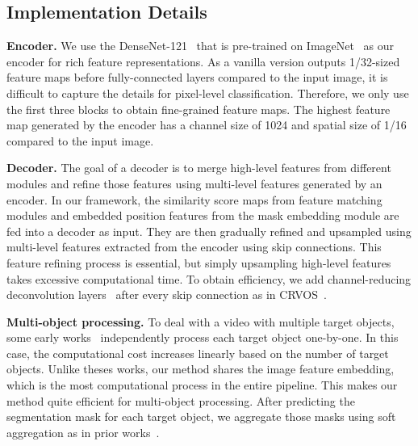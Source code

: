 \documentclass[10pt,twocolumn,letterpaper]{article}
\begin{document}
	
	
	\subsection{Implementation Details}
	\noindent\textbf{Encoder.} We use the DenseNet-121~\cite{densenet} that is pre-trained on ImageNet~\cite{imagenet} as our encoder for rich feature representations. As a vanilla version outputs 1/32-sized feature maps before fully-connected layers compared to the input image, it is difficult to capture the details for pixel-level classification. Therefore, we only use the first three blocks to obtain fine-grained feature maps. The highest feature map generated by the encoder has a channel size of 1024 and spatial size of 1/16 compared to the input image.
	
	
	\vspace{1mm}
	\noindent\textbf{Decoder.} The goal of a decoder is to merge high-level features from different modules and refine those features using multi-level features generated by an encoder. In our framework, the similarity score maps from feature matching modules and embedded position features from the mask embedding module are fed into a decoder as input. They are then gradually refined and upsampled using multi-level features extracted from the encoder using skip connections. This feature refining process is essential, but simply upsampling high-level features takes excessive computational time. To obtain efficiency, we add channel-reducing deconvolution layers~\cite{deconv} after every skip connection as in CRVOS~\cite{CRVOS}.
	
	
	\vspace{1mm}
	\noindent\textbf{Multi-object processing.} To deal with a video with multiple target objects, some early works~\cite{RGMP, STM, KMN, RMNet} independently process each target object one-by-one. In this case, the computational cost increases linearly based on the number of target objects. Unlike theses works, our method shares the image feature embedding, which is the most computational process in the entire pipeline. This makes our method quite efficient for multi-object processing. After predicting the segmentation mask for each target object, we aggregate those masks using soft aggregation as in prior works~\cite{RGMP, A-GAME, STM}. 
	
	
\end{document}
